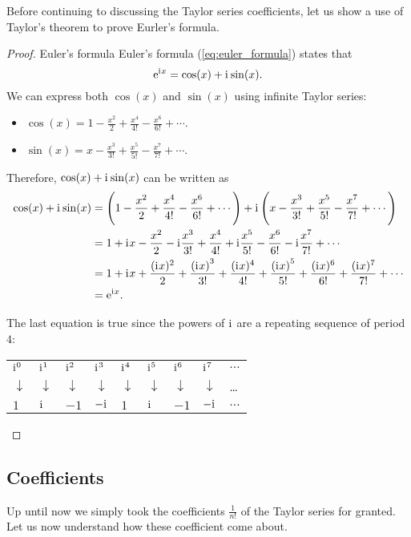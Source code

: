 Before continuing to discussing the Taylor series coefficients, let us show a use of Taylor's theorem to prove Eurler's formula.
\begin{proof}{Euler's formula}{}
  Euler's formula (\autoref{eq:euler_formula}) states that
  \[
    \mathrm{e}^{\mathrm{i}\mkern1mu x} = \cos(x) + \mathrm{i}\mkern1mu\sin(x).
  \]
  We can express both $\cos(x)$ and $\sin(x)$ using infinite Taylor series:
  \begin{itemize}
    \item $\cos(x) = 1-\frac{x^{2}}{2}+\frac{x^{4}}{4!}-\frac{x^{6}}{6!}+\cdots$.
    \item $\sin(x) = x-\frac{x^{3}}{3!}+\frac{x^{5}}{5!}-\frac{x^{7}}{7!}+\cdots$.
  \end{itemize}
  Therefore, $\cos(x)+\mathrm{i}\mkern1mu\sin(x)$ can be written as
  \begin{align*}
    \cos(x) + \mathrm{i}\mkern1mu\sin(x) &= \left(1-\frac{x^{2}}{2}+\frac{x^{4}}{4!}-\frac{x^{6}}{6!}+\cdots\right) + \mathrm{i}\mkern1mu\left(x-\frac{x^{3}}{3!}+\frac{x^{5}}{5!}-\frac{x^{7}}{7!}+\cdots\right)\\
                         &= 1+\mathrm{i}\mkern1mu x - \frac{x^{2}}{2} -\mathrm{i}\mkern1mu\frac{x^{3}}{3!} + \frac{x^{4}}{4!} + \mathrm{i}\mkern1mu\frac{x^{5}}{5!} - \frac{x^{6}}{6!} - \mathrm{i}\mkern1mu\frac{x^{7}}{7!} + \cdots\\
                         &= 1 +\mathrm{i}\mkern1mu x + \frac{(\mathrm{i}\mkern1mu x)^{2}}{2} + \frac{\left(\mathrm{i}\mkern1mu x\right)^{3}}{3!} + \frac{(\mathrm{i}\mkern1mu x)^{4}}{4!} + \frac{\left(\mathrm{i}\mkern1mu x\right)^{5}}{5!} + \frac{(\mathrm{i}\mkern1mu x)^{6}}{6!} + \frac{(\mathrm{i}\mkern1mu x)^{7}}{7!} + \cdots\\
                         &= \mathrm{e}^{\mathrm{i}\mkern1mu x}.
  \end{align*}

  The last equation is true since the powers of $\mathrm{i}\mkern1mu$ are a repeating sequence of period $4$:
  
  \centering
  \begin{tabular}{lllllllll}
    $\mathrm{i}\mkern1mu^{0}$ & $\mathrm{i}\mkern1mu^{1}$ & $\mathrm{i}\mkern1mu^{2}$ & $\mathrm{i}\mkern1mu^{3}$ & $\mathrm{i}\mkern1mu^{4}$ & $\mathrm{i}\mkern1mu^{5}$ & $\mathrm{i}\mkern1mu^{6}$ & $\mathrm{i}\mkern1mu^{7}$ & $\dots$\\
    $\downarrow$ & $\downarrow$ & $\downarrow$ & $\downarrow$ & $\downarrow$ & $\downarrow$ & $\downarrow$ & $\downarrow$ & \dots\\
    $1$ & $\mathrm{i}\mkern1mu$ & $-1$ & $-\mathrm{i}\mkern1mu$ & $1$ & $\mathrm{i}\mkern1mu$ & $-1$ & $-\mathrm{i}\mkern1mu$ & $\dots$\\
  \end{tabular}
\end{proof}

\subsection{Coefficients}
Up until now we simply took the coefficients $\frac{1}{n!}$ of the Taylor series for granted. Let us now understand how these coefficient come about.

